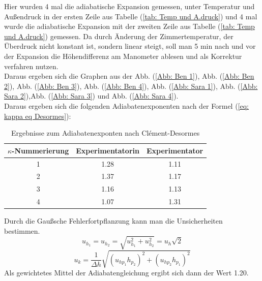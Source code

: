 \documentclass[bibliography=totocnumbered]{scrartcl}
\begin{document}
	Hier wurden 4 mal die adiabatische Expansion gemessen, unter Temperatur und Außendruck in der ersten Zeile aus Tabelle (\ref{tab: Temp und A.druck}) und 4 mal wurde die adiabatische Expansion mit der zweiten Zeile aus Tabelle (\ref{tab: Temp und A.druck}) gemessen.
	 Da durch Änderung der Zimmertemperatur, der Überdruck nicht konstant ist, sondern linear steigt, soll man 5 min nach und vor der Expansion die Höhendifferenz am Manometer ablesen und als Korrektur verfahren nutzen. \\
	 Daraus ergeben sich die Graphen aus der Abb. (\ref{Abb: Ben 1}), Abb. (\ref{Abb: Ben 2}), Abb. (\ref{Abb: Ben 3}), Abb. (\ref{Abb: Ben 4}), Abb. (\ref{Abb: Sara 1}), Abb. (\ref{Abb: Sara 2}),Abb. (\ref{Abb: Sara 3}) und Abb. (\ref{Abb: Sara 4}).\\
	 Daraus ergeben sich die folgenden Adiabatenexponenten nach der Formel (\ref{eq: kappa eq Desormes}):
	 \begin{table}[ht!]
	\centering
	\caption{Ergebnisse zum Adiabatenexponten nach Clément-Desormes}
	 	\begin{tabular}{|c|c|c|}
	 		\hline
	 		$\kappa$-Nummerierung & Experimentatorin & Experimentator \\
	 		\hline
	 		1 & 1.28 & 1.11 \\
	 		\hline
	 		2 & 1.37 & 1.17 \\
	 		\hline
	 		3 & 1.16 & 1.13 \\
	 		\hline
	 		4 & 1.07 & 1.31 \\
	 		\hline
	 	\end{tabular}
 	\label{tab: kappa nach Clément}
	 \end{table}
 
	  Durch die Gaußsche Fehlerfortpflanzung kann man die Unsicherheiten bestimmen.
	  \begin{equation}\label{eq: Unsicherheit h}
	  	u_{h_{1}}=u_{h_{2}}=\sqrt{u_{h_{1}}^{2}+u_{h_{2}}^{2}}=u_{h}\sqrt{2}
	  \end{equation}
	 \begin{equation}\label{eq: Unsicherheit kappa}
	 	u_{k}=\dfrac{1}{\Delta h}\sqrt{\left(u_{hp_{1}}h_{p_{2}}\right)^{2}+\left(u_{hp_{2}}h_{p_{1}}\right)^{2}}
	 \end{equation}
 Als gewichtetes Mittel der Adiabatengleichung ergibt sich dann der Wert 1.20.
	
	
	
	\newpage
\end{document}

